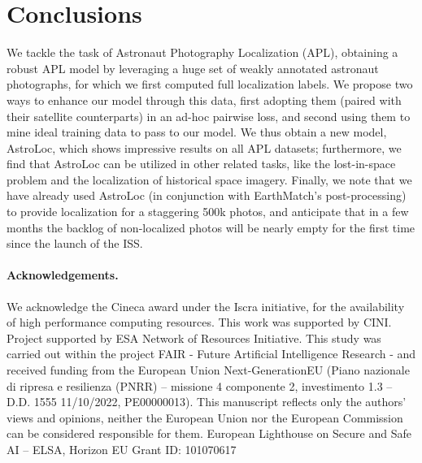 
\section{Conclusions}
\label{sec:conclusions}
We tackle the task of Astronaut Photography Localization (APL), obtaining a robust APL model by leveraging a huge set of weakly annotated astronaut photographs, for which we first computed full localization labels.
We propose two ways to enhance our model through this data, first adopting them (paired with their satellite counterparts) in an ad-hoc pairwise loss, and second using them to mine ideal training data to pass to our model.
We thus obtain a new model, AstroLoc, which shows impressive results on all APL datasets; furthermore, we find that AstroLoc can be utilized in other related tasks, like the lost-in-space problem and the localization of historical space imagery.
Finally, we note that we have already used AstroLoc (in conjunction with EarthMatch's post-processing) to provide localization for a staggering 500k photos, and anticipate that in a few months the backlog of non-localized photos will be nearly empty for the first time since the launch of the ISS.


\paragraph{Acknowledgements.}
\small{We acknowledge the Cineca award under the Iscra initiative, for the availability of high performance computing resources.
This work was supported by CINI.
Project supported by ESA Network of Resources Initiative.
This study was carried out within the project FAIR - Future Artificial Intelligence Research - and received funding from the European Union Next-GenerationEU (Piano nazionale di ripresa e resilienza (PNRR) – missione 4 componente 2, investimento 1.3 – D.D. 1555 11/10/2022, PE00000013). This manuscript reflects only the authors’ views and opinions, neither the European Union nor the European Commission can be considered responsible for them.
European Lighthouse on Secure and Safe AI – ELSA, Horizon EU Grant ID: 101070617
}
